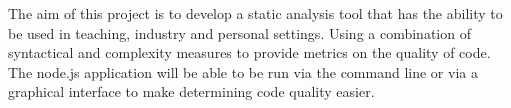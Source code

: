 The aim of this project is to develop a static analysis tool that has the ability to be used in teaching, industry and personal settings. Using a combination of syntactical and complexity measures to provide metrics on the quality of code. The node.js application will be able to be run via the command line or via a graphical interface to make determining code quality easier.
